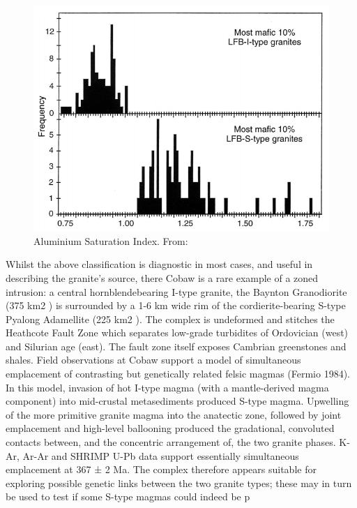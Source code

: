 \documentclass[a4paper]{article}
\begin{document}
\begin{figure}[H]
\centering
\includegraphics[width=1\textwidth]{Aluminium_Saturation_Index.jpg}
\caption{\label{fig:AluminiumSaturationIndex}Aluminium Saturation Index. From: \cite{chappell1998high}}
\end{figure}

Whilst the above classification is diagnostic in most cases, and useful in describing the granite's source, there Cobaw is a rare example of a zoned intrusion: a central hornblendebearing
I-type granite, the Baynton Granodiorite (375 km2
) is surrounded by a 1-6 km wide
rim of the cordierite-bearing S-type Pyalong Adamellite (225 km2
). The complex is
undeformed and stitches the Heathcote Fault Zone which separates low-grade turbidites of
Ordovician (west) and Silurian age (east). The fault zone itself exposes Cambrian greenstones
and shales. Field observations at Cobaw support a model of simultaneous emplacement of
contrasting but genetically related felsic magmas (Fermio 1984). In this model, invasion of
hot I-type magma (with a mantle-derived magma component) into mid-crustal metasediments
produced S-type magma. Upwelling of the more primitive granite magma into the anatectic
zone, followed by joint emplacement and high-level ballooning produced the gradational,
convoluted contacts between, and the concentric arrangement of, the two granite phases.
K-Ar, Ar-Ar and SHRIMP U-Pb data support essentially simultaneous emplacement at
367 ± 2 Ma. The complex therefore appears suitable for exploring possible genetic links
between the two granite types; these may in turn be used to test if some S-type magmas could
indeed be p
\end{document}
